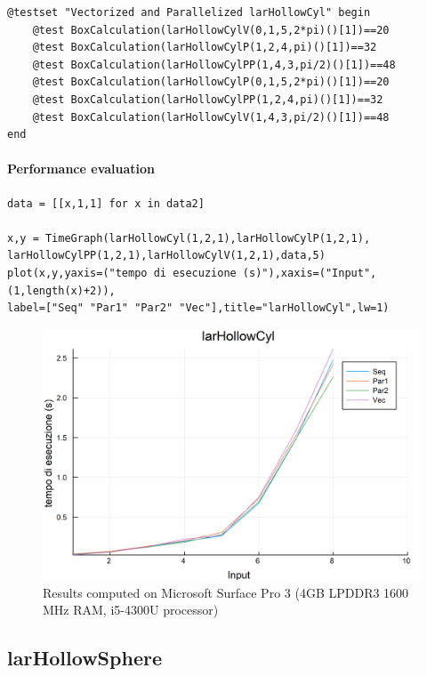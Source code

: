 \documentclass{article}
\begin{document}
\begin{Verbatim}
@testset "Vectorized and Parallelized larHollowCyl" begin
    @test BoxCalculation(larHollowCylV(0,1,5,2*pi)()[1])==20
    @test BoxCalculation(larHollowCylP(1,2,4,pi)()[1])==32
    @test BoxCalculation(larHollowCylPP(1,4,3,pi/2)()[1])==48
    @test BoxCalculation(larHollowCylP(0,1,5,2*pi)()[1])==20
    @test BoxCalculation(larHollowCylPP(1,2,4,pi)()[1])==32
    @test BoxCalculation(larHollowCylV(1,4,3,pi/2)()[1])==48
end
\end{Verbatim}

\paragraph{Performance evaluation}

\begin{Verbatim}
data = [[x,1,1] for x in data2]

x,y = TimeGraph(larHollowCyl(1,2,1),larHollowCylP(1,2,1),
larHollowCylPP(1,2,1),larHollowCylV(1,2,1),data,5)
plot(x,y,yaxis=("tempo di esecuzione (s)"),xaxis=("Input",(1,length(x)+2)),
label=["Seq" "Par1" "Par2" "Vec"],title="larHollowCyl",lw=1)

\end{Verbatim}

\begin{figure}[htbp] 
\centering 
\includegraphics[scale=.13]{larHollowCylTime.png} 
\caption{Results computed on Microsoft Surface Pro  3 (4GB LPDDR3 1600 MHz RAM, i5-4300U processor)} 
\end{figure}
\subsection{larHollowSphere}
\end{document}
